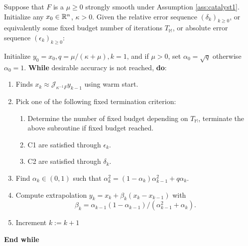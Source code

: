 \documentclass[12pt]{article}
\begin{document}
            \begin{definition}\label{def:catalyst-relative}
                Suppose that $F$ is a $\mu \ge 0$ strongly smooth under Assumption \ref{ass:catalyst1}. 
                Initialize any $x_0 \in \mathbb {\mathbb R}^n$, $\kappa > 0$. 
                Given the relative error sequence $(\delta_k)_{k \ge 0}$, or equivalently some fixed budget number of iterations $T_{\mathbb M}$, or absolute error sequence $(\epsilon_k)_{k \ge 0}$: 
                \begin{tcolorbox}
                    Initialize $y_0 = x_0, q = \mu/(\kappa + \mu), k = 1$, and if $\mu > 0$, set $\alpha_0 = \sqrt{q}$ otherwise $\alpha_0 = 1$.  
                    \textbf{While} desirable accuracy is not reached, \textbf{do}: 
                    \begin{enumerate}
                        \item Finds $x_k \approx \mathcal J_{\kappa^{-1}F} y_{k - 1}$ using warm start. 
                        \item Pick one of the following fixed termination criterion: 
                        \begin{enumerate}
                            \item Determine the number of fixed budget depending on $T_{\mathbb M}$, terminate the above subroutine if fixed budget reached.
                            \item C1 are satisfied through $\epsilon_k$. 
                            \item C2 are satisfied through $\delta_k$. 
                        \end{enumerate}
                        \item Find $\alpha_k \in (0, 1)$ such that $\alpha_k^2 = (1 - \alpha_{k})\alpha_{k - 1}^2 + q\alpha_k$. 
                        \item Compute extrapolation $y_k = x_k + \beta_k(x_k - x_{k - 1})$ with 
                        $$
                            \beta_{k} = \alpha_{k - 1}(1 - \alpha_{k - 1})/(\alpha_{k - 1}^2 + \alpha_k). 
                        $$
                        \item Increment $k := k + 1$
                    \end{enumerate}
                    \textbf{End while} 
                \end{tcolorbox}
            \end{definition}
\end{document}
